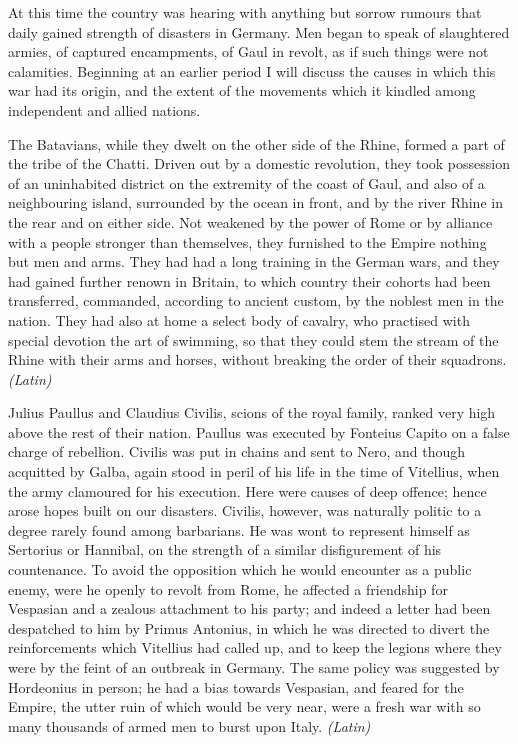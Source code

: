 
At this time the country was hearing with anything but sorrow rumours that daily gained strength of disasters in Germany. Men began to speak of slaughtered armies, of captured encampments, of Gaul in revolt, as if such things were not calamities. Beginning at an earlier period I will discuss the causes in which this war had its origin, and the extent of the movements which it kindled among independent and allied nations.

The Batavians, while they dwelt on the other side of the Rhine, formed a part of the tribe of the Chatti. Driven out by a domestic revolution, they took possession of an uninhabited district on the extremity of the coast of Gaul, and also of a neighbouring island, surrounded by the ocean in front, and by the river Rhine in the rear and on either side. Not weakened by the power of Rome or by alliance with a people stronger than themselves, they furnished to the Empire nothing but men and arms. They had had a long training in the German wars, and they had gained further renown in Britain, to which country their cohorts had been transferred, commanded, according to ancient custom, by the noblest men in the nation. They had also at home a select body of cavalry, who practised with special devotion the art of swimming, so that they could stem the stream of the Rhine with their arms and horses, without breaking the order of their squadrons. \emph{(Latin)}


Julius Paullus and Claudius Civilis, scions of the royal family, ranked very high above the rest of their nation. Paullus was executed by Fonteius Capito on a false charge of rebellion. Civilis was put in chains and sent to Nero, and though acquitted by Galba, again stood in peril of his life in the time of Vitellius, when the army clamoured for his execution. Here were causes of deep offence; hence arose hopes built on our disasters. Civilis, however, was naturally politic to a degree rarely found among barbarians. He was wont to represent himself as Sertorius or Hannibal, on the strength of a similar disfigurement of his countenance. To avoid the opposition which he would encounter as a public enemy, were he openly to revolt from Rome, he affected a friendship for Vespasian and a zealous attachment to his party; and indeed a letter had been despatched to him by Primus Antonius, in which he was directed to divert the reinforcements which Vitellius had called up, and to keep the legions where they were by the feint of an outbreak in Germany. The same policy was suggested by Hordeonius in person; he had a bias towards Vespasian, and feared for the Empire, the utter ruin of which would be very near, were a fresh war with so many thousands of armed men to burst upon Italy. \emph{(Latin)}

